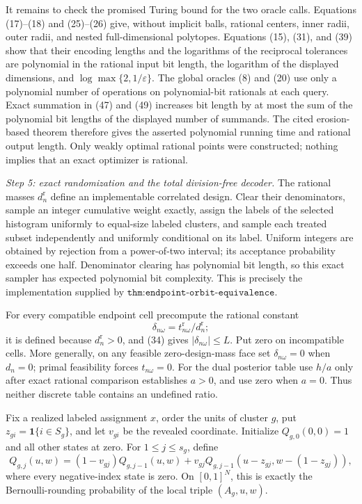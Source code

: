 It remains to check the promised Turing bound for the two oracle calls.  Equations (17)--(18) and (25)--(26) give, without implicit balls, rational centers, inner radii, outer radii, and nested full-dimensional polytopes.  Equations (15), (31), and (39) show that their encoding lengths and the logarithms of the reciprocal tolerances are polynomial in the rational input bit length, the logarithm of the displayed dimensions, and \(\log\max\{2,1/\varepsilon\}\).  The global oracles (8) and (20) use only a polynomial number of operations on polynomial-bit rationals at each query.  Exact summation in (47) and (49) increases bit length by at most the sum of the polynomial bit lengths of the displayed number of summands.  The cited erosion-based theorem therefore gives the asserted polynomial running time and rational output length.  Only weakly optimal rational points were constructed; nothing implies that an exact optimizer is rational.

\emph{Step 5: exact randomization and the total division-free decoder.}
The rational masses \(d_n^{\mathrm r}\) define an implementable correlated design.  Clear their denominators, sample an integer cumulative weight exactly, assign the labels of the selected histogram uniformly to equal-size labeled clusters, and sample each treated subset independently and uniformly conditional on its label.  Uniform integers are obtained by rejection from a power-of-two interval; its acceptance probability exceeds one half.  Denominator clearing has polynomial bit length, so this exact sampler has expected polynomial bit complexity.  This is precisely the implementation supplied by \(\texttt{thm:endpoint-orbit-equivalence}\).

For every compatible endpoint cell precompute the rational constant
\[
 \delta_{n\omega}=t^{\mathrm r}_{n\omega}/d_n^{\mathrm r};
\tag{50}
\]
it is defined because \(d_n^{\mathrm r}>0\), and (34) gives \(|\delta_{n\omega}|\le L\).  Put zero on incompatible cells.  More generally, on any feasible zero-design-mass face set \(\delta_{n\omega}=0\) when \(d_n=0\); primal feasibility forces \(t_{n\omega}=0\).  For the dual posterior table use \(h/a\) only after exact rational comparison establishes \(a>0\), and use zero when \(a=0\).  Thus neither discrete table contains an undefined ratio.

Fix a realized labeled assignment \(x\), order the units of cluster \(g\), put \(z_{gi}=\mathbf 1\{i\in S_g\}\), and let \(v_{gi}\) be the revealed coordinate.  Initialize \(Q_{g,0}(0,0)=1\) and all other states at zero.  For \(1\le j\le s_g\), define
\[
 Q_{g,j}(u,w)
 =(1-v_{gj})Q_{g,j-1}(u,w)
 +v_{gj}Q_{g,j-1}(u-z_{gj},w-(1-z_{gj})),
\tag{51}
\]
where every negative-index state is zero.  On \([0,1]^N\), this is exactly the Bernoulli-rounding probability of the local triple \((A_g,u,w)\).

